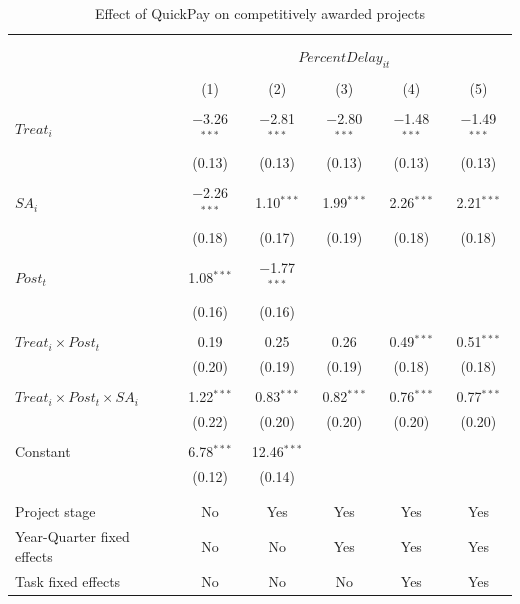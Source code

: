 \documentclass[
]{article}
\begin{document}
\begin{table}[H] \centering 
  \caption{Effect of QuickPay on competitively awarded projects} 
  \label{} 
\small 
\begin{tabular}{@{\extracolsep{-2pt}}lccccc} 
\\[-1.8ex]\hline 
\hline \\[-1.8ex] 
\\[-1.8ex] & \multicolumn{5}{c}{$PercentDelay_{it}$  } \\ 
\\[-1.8ex] & (1) & (2) & (3) & (4) & (5)\\ 
\hline \\[-1.8ex] 
 $Treat_i$ & $-$3.26$^{***}$ & $-$2.81$^{***}$ & $-$2.80$^{***}$ & $-$1.48$^{***}$ & $-$1.49$^{***}$ \\ 
  & (0.13) & (0.13) & (0.13) & (0.13) & (0.13) \\ 
  & & & & & \\ 
 $SA_i$ & $-$2.26$^{***}$ & 1.10$^{***}$ & 1.99$^{***}$ & 2.26$^{***}$ & 2.21$^{***}$ \\ 
  & (0.18) & (0.17) & (0.19) & (0.18) & (0.18) \\ 
  & & & & & \\ 
 $Post_t$ & 1.08$^{***}$ & $-$1.77$^{***}$ &  &  &  \\ 
  & (0.16) & (0.16) &  &  &  \\ 
  & & & & & \\ 
 $Treat_i \times Post_t$ & 0.19 & 0.25 & 0.26 & 0.49$^{***}$ & 0.51$^{***}$ \\ 
  & (0.20) & (0.19) & (0.19) & (0.18) & (0.18) \\ 
  & & & & & \\ 
 $Treat_i \times Post_t \times SA_i $ & 1.22$^{***}$ & 0.83$^{***}$ & 0.82$^{***}$ & 0.76$^{***}$ & 0.77$^{***}$ \\ 
  & (0.22) & (0.20) & (0.20) & (0.20) & (0.20) \\ 
  & & & & & \\ 
 Constant & 6.78$^{***}$ & 12.46$^{***}$ &  &  &  \\ 
  & (0.12) & (0.14) &  &  &  \\ 
  & & & & & \\ 
\hline \\[-1.8ex] 
Project stage & No & Yes & Yes & Yes & Yes \\ 
Year-Quarter fixed effects & No & No & Yes & Yes & Yes \\ 
Task fixed effects & No & No & No & Yes & Yes \\ 

\end{tabular}
\end{table}
\end{document}
